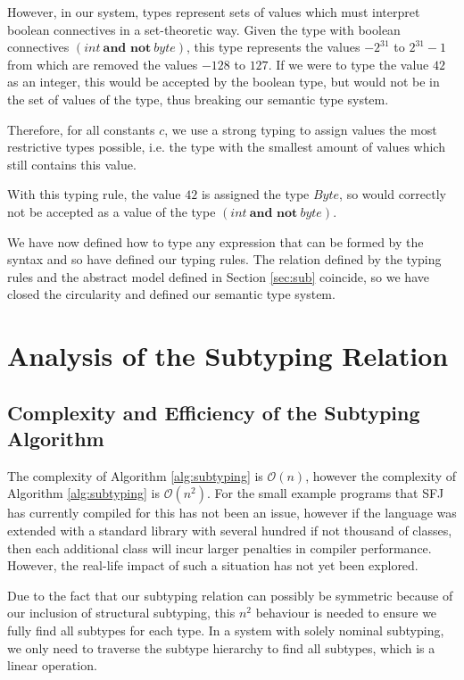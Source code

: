 \documentclass{l4proj}
\begin{document}
However, in our system, types represent sets of values which must interpret boolean connectives in a set-theoretic way.
Given the type with boolean connectives $(int\ \textbf{and not}\ byte)$, this type represents the values $-2^31$ to $2^31 - 1$ from which are removed the values $-128$ to $127$.
If we were to type the value $42$ as an integer, this would be accepted by the boolean type, but would not be in the set of values of the type, thus breaking our semantic type system.

Therefore, for all constants $c$, we use a strong typing to assign values the most restrictive types possible, i.e. the type with the smallest amount of values which still contains this value.

With this typing rule, the value $42$ is assigned the type $Byte$, so would correctly not be accepted as a value of the type $(int\ \textbf{and not}\ byte)$.

We have now defined how to type any expression that can be formed by the syntax and so have defined our typing rules.
The relation defined by the typing rules and the abstract model defined in Section \ref{sec:sub} coincide, so we have closed the circularity and defined our semantic type system.

\section{Analysis of the Subtyping Relation}

\subsection{Complexity and Efficiency of the Subtyping Algorithm}

The complexity of Algorithm \ref{alg:subtyping} is $\mathcal{O}(n)$, however the complexity of Algorithm \ref{alg:subtyping} is $\mathcal{O}(n^{2})$.
For the small example programs that SFJ has currently compiled for this has not been an issue, however if the language was extended with a standard library with several hundred if not thousand of classes, then each additional class will incur larger penalties in compiler performance.
However, the real-life impact of such a situation has not yet been explored.

Due to the fact that our subtyping relation can possibly be symmetric because of our inclusion of structural subtyping, this $n^{2}$ behaviour is needed to ensure we fully find all subtypes for each type.
In a system with solely nominal subtyping, we only need to traverse the subtype hierarchy to find all subtypes, which is a linear operation.
\end{document}
